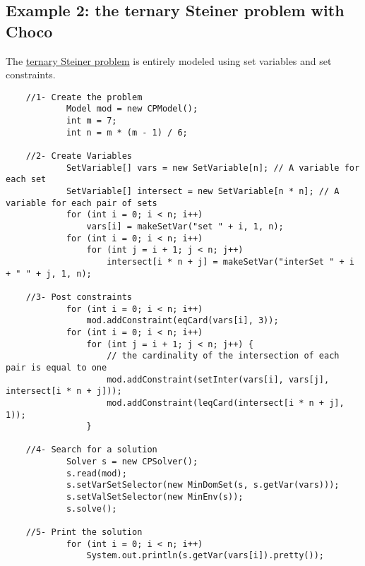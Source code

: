 \subsection{Example 2: the ternary Steiner problem with Choco}\label{model:example2:ternarysteinerchoco}\hypertarget{model:example2:ternarysteinerchoco}{}
The \hyperlink{introduction:example2:theternarysteinerproblem}{ternary Steiner problem} is entirely modeled using set variables and set constraints. 
\begin{lstlisting}
	//1- Create the problem
	        Model mod = new CPModel();
	        int m = 7;
	        int n = m * (m - 1) / 6;
	
	//2- Create Variables
	        SetVariable[] vars = new SetVariable[n]; // A variable for each set
	        SetVariable[] intersect = new SetVariable[n * n]; // A variable for each pair of sets
	        for (int i = 0; i < n; i++)
	            vars[i] = makeSetVar("set " + i, 1, n);
	        for (int i = 0; i < n; i++)
	            for (int j = i + 1; j < n; j++)
	                intersect[i * n + j] = makeSetVar("interSet " + i + " " + j, 1, n);
	
	//3- Post constraints
	        for (int i = 0; i < n; i++)
	            mod.addConstraint(eqCard(vars[i], 3));
	        for (int i = 0; i < n; i++)
	            for (int j = i + 1; j < n; j++) {
	                // the cardinality of the intersection of each pair is equal to one
	                mod.addConstraint(setInter(vars[i], vars[j], intersect[i * n + j]));
	                mod.addConstraint(leqCard(intersect[i * n + j], 1));
	            }
	
	//4- Search for a solution
	        Solver s = new CPSolver();
	        s.read(mod);
	        s.setVarSetSelector(new MinDomSet(s, s.getVar(vars)));
	        s.setValSetSelector(new MinEnv(s));
	        s.solve();

	//5- Print the solution
	        for (int i = 0; i < n; i++)
	            System.out.println(s.getVar(vars[i]).pretty());
\end{lstlisting}

